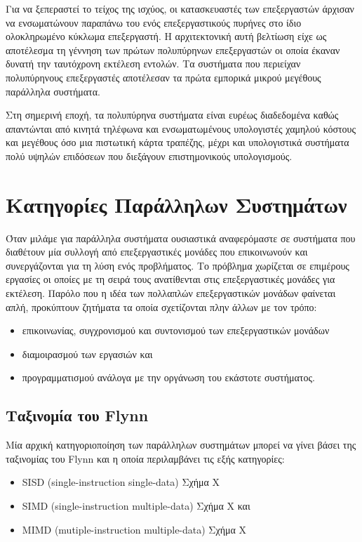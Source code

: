 Για να ξεπεραστεί το τείχος της ισχύος, οι κατασκευαστές των επεξεργαστών άρχισαν να ενσωματώνουν παραπάνω του ενός επεξεργαστικούς πυρήνες στο ίδιο ολοκληρωμένο κύκλωμα επεξεργαστή. Η αρχιτεκτονική αυτή βελτίωση είχε ως αποτέλεσμα τη γέννηση των πρώτων πολυπύρηνων επεξεργαστών οι οποία έκαναν δυνατή την ταυτόχρονη εκτέλεση εντολών. Τα συστήματα που περιείχαν πολυπύρηνους επεξεργαστές αποτέλεσαν τα πρώτα εμπορικά μικρού μεγέθους παράλληλα συστήματα.

Στη σημερινή εποχή, τα πολυπύρηνα συστήματα είναι ευρέως διαδεδομένα καθώς απαντώνται από κινητά τηλέφωνα και ενσωματωμένους υπολογιστές χαμηλού κόστους και μεγέθους όσο μια πιστωτική κάρτα τραπέζης, μέχρι και υπολογιστικά συστήματα πολύ υψηλών επιδόσεων που διεξάγουν επιστημονικούς υπολογισμούς.


\section{Κατηγορίες Παράλληλων Συστημάτων}
\label{sec:Parallel System Categories}
Όταν μιλάμε για παράλληλα συστήματα ουσιαστικά αναφερόμαστε σε συστήματα που διαθέτουν μία συλλογή από επεξεργαστικές μονάδες που επικοινωνούν και συνεργάζονται για τη λύση ενός προβλήματος. Το πρόβλημα χωρίζεται σε επιμέρους εργασίες οι οποίες με τη σειρά τους ανατίθενται στις επεξεργαστικές μονάδες για εκτέλεση. Παρόλο που η ιδέα των πολλαπλών επεξεργαστικών μονάδων φαίνεται απλή, προκύπτουν ζητήματα τα οποία σχετίζονται πλην άλλων με τον τρόπο:
\begin{itemize}
	\item επικοινωνίας, συγχρονισμού και συντονισμού των επεξεργαστικών μονάδων
	\item διαμοιρασμού των εργασιών και
	\item προγραμματισμού ανάλογα με την οργάνωση του εκάστοτε συστήματος.
\end{itemize}
 
\subsection{Ταξινομία του Flynn}
Μία αρχική κατηγοριοποίηση των παράλληλων συστημάτων μπορεί να γίνει βάσει της ταξινομίας του Flynn και η οποία περιλαμβάνει τις εξής κατηγορίες:
\begin{itemize}
	\item SISD (single-instruction single-data) Σχήμα Χ
	\item SIMD (single-instruction multiple-data) Σχήμα Χ και
	\item MIMD (mutiple-instruction multiple-data) Σχήμα Χ
\end{itemize}

